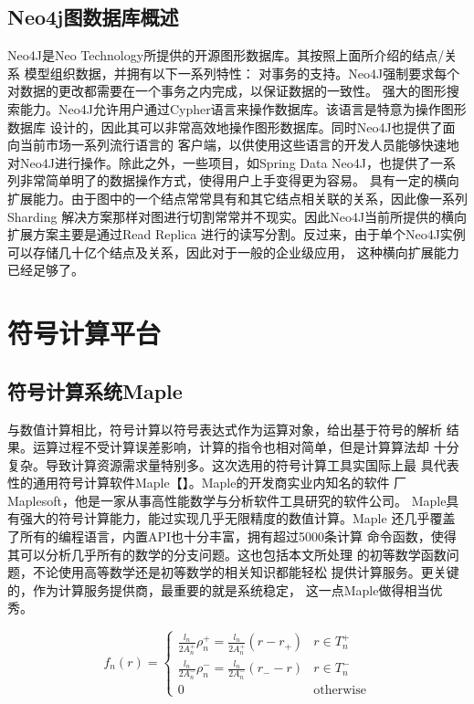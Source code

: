 \documentclass{standalone}
\begin{document}
\subsection{Neo4j图数据库概述}
Neo4J是Neo Technology所提供的开源图形数据库。其按照上面所介绍的结点/关系
模型组织数据，并拥有以下一系列特性：
对事务的支持。Neo4J强制要求每个对数据的更改都需要在一个事务之内完成，以保证数据的一致性。
强大的图形搜索能力。Neo4J允许用户通过Cypher语言来操作数据库。该语言是特意为操作图形数据库
设计的，因此其可以非常高效地操作图形数据库。同时Neo4J也提供了面向当前市场一系列流行语言的
客户端，以供使用这些语言的开发人员能够快速地对Neo4J进行操作。除此之外，一些项目，如Spring
 Data Neo4J，也提供了一系列非常简单明了的数据操作方式，使得用户上手变得更为容易。
具有一定的横向扩展能力。由于图中的一个结点常常具有和其它结点相关联的关系，因此像一系列Sharding
解决方案那样对图进行切割常常并不现实。因此Neo4J当前所提供的横向扩展方案主要是通过Read Replica
进行的读写分割。反过来，由于单个Neo4J实例可以存储几十亿个结点及关系，因此对于一般的企业级应用，
这种横向扩展能力已经足够了。
\section{符号计算平台}
\subsection{符号计算系统Maple}
与数值计算相比，符号计算以符号表达式作为运算对象，给出基于符号的解析
结果。运算过程不受计算误差影响，计算的指令也相对简单，但是计算算法却
十分复杂。导致计算资源需求量特别多。这次选用的符号计算工具实国际上最
具代表性的通用符号计算软件Maple【】。Maple的开发商实业内知名的软件
厂Maplesoft，他是一家从事高性能数学与分析软件工具研究的软件公司。
Maple具有强大的符号计算能力，能过实现几乎无限精度的数值计算。Maple
还几乎覆盖了所有的编程语言，内置API也十分丰富，拥有超过5000条计算
命令函数，使得其可以分析几乎所有的数学的分支问题。这也包括本文所处理
的初等数学函数问题，不论使用高等数学还是初等数学的相关知识都能轻松
提供计算服务。更关键的，作为计算服务提供商，最重要的就是系统稳定，
这一点Maple做得相当优秀。

\begin{equation}
f_n(r)=
\begin{cases}
\frac{l_n}{2A_n^+}\rho_n^+=\frac{l_n}{2A_n^+}(r-r_+)&r\in T_n^+\\
\frac{l_n}{2A_n^-}\rho_n^-=\frac{l_n}{2A_n^-}(r_--r)&r\in T_n^-\\
0&\text{otherwise}
\end{cases}
\end{equation}
\end{document}
